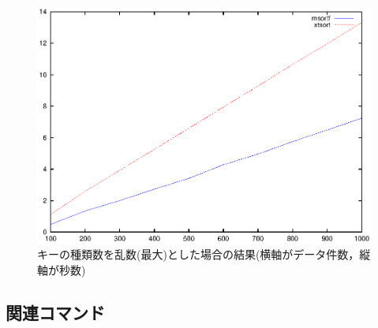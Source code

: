 \begin{figure}[!hbt]
\begin{center}
\includegraphics[scale=.8]{figure/msortf/line_rand.eps}
\end{center}
\caption{キーの種類数を乱数(最大)とした場合の結果(横軸がデータ件数，縦軸が秒数)\label{fig:msortf:bench4}}
\end{figure}

\subsection*{関連コマンド}

%
